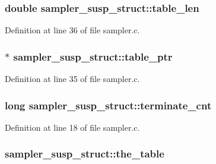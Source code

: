 \subsubsection[{\texorpdfstring{table\+\_\+len}{table_len}}]{\setlength{\rightskip}{0pt plus 5cm}double sampler\+\_\+susp\+\_\+struct\+::table\+\_\+len}\hypertarget{structsampler__susp__struct_abe71bed7c41fca0bed5ff4e065704d9a}{}\label{structsampler__susp__struct_abe71bed7c41fca0bed5ff4e065704d9a}


Definition at line 36 of file sampler.\+c.

\subsubsection[{\texorpdfstring{table\+\_\+ptr}{table_ptr}}]{$\ast$ sampler\+\_\+susp\+\_\+struct\+::table\+\_\+ptr}\hypertarget{structsampler__susp__struct_a43f6cf6c4bba56f55111de806d62c623}{}\label{structsampler__susp__struct_a43f6cf6c4bba56f55111de806d62c623}


Definition at line 35 of file sampler.\+c.

\subsubsection[{\texorpdfstring{terminate\+\_\+cnt}{terminate_cnt}}]{\setlength{\rightskip}{0pt plus 5cm}long sampler\+\_\+susp\+\_\+struct\+::terminate\+\_\+cnt}\hypertarget{structsampler__susp__struct_a52700e7baeb9de79d9b283f96ec85a30}{}\label{structsampler__susp__struct_a52700e7baeb9de79d9b283f96ec85a30}


Definition at line 18 of file sampler.\+c.

\subsubsection[{\texorpdfstring{the\+\_\+table}{the_table}}]{ sampler\+\_\+susp\+\_\+struct\+::the\+\_\+table}\hypertarget{structsampler__susp__struct_a5c970c7ae84312f2c3b5d6cf688d151b}{}\label{structsampler__susp__struct_a5c970c7ae84312f2c3b5d6cf688d151b}


